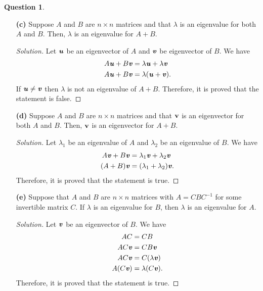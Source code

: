 \documentclass{article}
\renewcommand{\v}{{\bf v}}
\theoremstyle{definition}
\newtheorem{question}{Question}
\newcommand{\vt}[1]{\textbf{\textit{#1}}}
\newcommand{\0}{\textbf{0}}
\begin{document}
\begin{question}
\begin{enumerate}
\item[{\bf (c)}] Suppose $A$ and $B$ are $n\times n$ matrices and that $\lambda$ is an eigenvalue for both $A$ and $B$. Then, $\lambda$ is an eigenvalue for $A+B$.

\begin{proof}[Solution]
    Let \(\vt{u}\) be an eigenvector of \(A\) and \(\vt{v}\) be eigenvector of \(B\). We have
    \begin{align*}
        A\vt{u}+B\vt{v} &= \lambda\vt{u}+\lambda\vt{v} \\
        A\vt{u}+B\vt{v} &= \lambda(\vt{u}+\vt{v}).
    \end{align*} If \(\vt{u}\neq\vt{v}\) then \(\lambda\) is not an eigenvalue of \(A+B\).
    Therefore, it is proved that the statement is false.
\end{proof}
\vspace{.25cm}

\item[{\bf (d)}] Suppose $A$ and $B$ are $n\times n$ matrices and that $\v$ is an eigenvector for both $A$ and $B$. Then, $\v$ is an eigenvector for $A+B$.

\begin{proof}[Solution]
    Let \(\lambda_1\) be an eigenvalue of \(A\) and \(\lambda_2\) be an eigenvalue of \(B\).
    We have
    \begin{align*}
        A\vt{v}+B\vt{v} &= \lambda_1\vt{v} + \lambda_2\vt{v} \\
        (A+B)\vt{v} &= (\lambda_1+\lambda_2)\vt{v}.
    \end{align*}
    Therefore, it is proved that the statement is true.
\end{proof}

\vspace{.25cm}

\item[{\bf (e)}] Suppose that $A$ and $B$ are $n\times n$ matrices with $A = CBC^{-1}$ for some invertible matrix $C$. If $\lambda$ is an eigenvalue for $B$, then $\lambda$ is an eigenvalue for $A$.

\begin{proof}[Solution]
    Let \(\vt{v}\) be an eigenvector of \(B\). We have
    \begin{align*}
        AC &= CB \\
        AC\vt{v} &= CB\vt{v} \\
        AC\vt{v} &= C(\lambda\vt{v}) \\
        A(C\vt{v}) &= \lambda (C\vt{v}).
    \end{align*}
    Therefore, it is proved that the statement is true.
\end{proof}

\end{enumerate}

\end{question}
\end{document}
